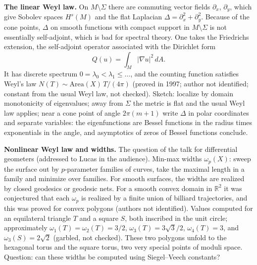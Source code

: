 \medskip\noindent
{\bf The linear Weyl law.} On
$M\setminus\Sigma$ there are commuting vector
fields $\partial_x$, $\partial_y$, which give
Sobolev spaces $H^s(M)$ and the flat
Laplacian $\Delta=\partial_x^2+\partial_y^2$.
Because of the cone points, $\Delta$ on
smooth functions with compact support in
$M\setminus\Sigma$ is not essentially
self-adjoint, which is bad for spectral
theory. One takes the Friedrichs extension,
the self-adjoint operator associated with the
Dirichlet form
$$
Q(u)=\int_M |\nabla u|^2\,dA.
$$
It has discrete spectrum
$0=\lambda_0<\lambda_1\leq\dots$, and the
counting function satisfies Weyl's law
$N(T)\sim\mathrm{Area}(X)\,T/(4\pi)$ (proved
in 1997; author not identified;
constant from the usual Weyl law,
not checked). Sketch: localize by domain
monotonicity of eigenvalues; away from
$\Sigma$ the metric is flat and the usual
Weyl law applies; near a cone point of angle
$2\pi(m+1)$ write $\Delta$ in polar
coordinates and separate variables: the
eigenfunctions are Bessel functions in the
radius times exponentials in the angle, and
asymptotics of zeros of Bessel functions
conclude.

\medskip\noindent
{\bf Nonlinear Weyl law and widths.} The
question of the talk for differential
geometers (addressed to Lucas in the
audience). Min-max widths $\omega_p(X)$:
sweep the surface out by $p$-parameter
families of curves, take the maximal length
in a family and minimize over families. For
smooth surfaces, the widths are realized by
closed geodesics or geodesic nets.
For a smooth convex domain in $\mathbb{R}^2$
it was conjectured that each $\omega_p$ is
realized by a finite union of billiard
trajectories, and this was proved for convex
polygons (authors not identified). Values computed for an
equilateral triangle $T$ and a square $S$,
both inscribed in the unit circle;
approximately
$\omega_1(T)=\omega_2(T)=3/2$,
$\omega_3(T)=3\sqrt{3}/2$, $\omega_4(T)=3$,
and $\omega_3(S)=2\sqrt{2}$ (garbled, not
checked). These two polygons unfold to the
hexagonal torus and the square torus, two
very special points of moduli space.
Question: can these widths be computed using
Siegel--Veech constants?

